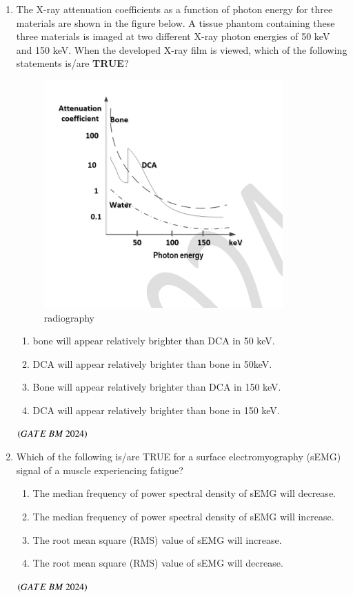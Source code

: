 \documentclass[journal,12pt,onecolumn]{IEEEtran}
\theoremstyle{remark}
\begin{document}
\begin{enumerate}
\item The X-ray attenuation coefficients as a function of photon energy for three materials are shown in the figure below. A tissue phantom containing these three materials is imaged at two different X-ray photon energies of 50 keV and 150 keV. When the developed X-ray film is viewed, which of the following statements is/are \textbf{TRUE}?
\begin{figure}[H]
\centering
\includegraphics[width=0.4\columnwidth]{Figs/Fig 14.png}
\caption{radiography}
\label{fig:placeholder}
\end{figure}
\begin{enumerate}[label=(\Alph*)]
    \item bone will appear relatively brighter than DCA in 50 keV.
    \item DCA will appear relatively brighter than bone in 50keV.
    \item Bone will appear relatively brighter than DCA in 150 keV.
    \item DCA will appear relatively brighter than bone in 150 keV.
\end{enumerate}
\hfill $\brak{GATE\ BM\ 2024}$

\item Which of the following is/are TRUE for a surface electromyography (sEMG) signal
of a muscle experiencing fatigue?
\begin{enumerate}[label=(\Alph*)]
\item  The median frequency of power spectral density of sEMG will decrease.
\item  The median frequency of power spectral density of sEMG will increase.
\item The root mean square (RMS) value of sEMG will increase.
\item The root mean square (RMS) value of sEMG will decrease.
\end{enumerate}
\hfill $\brak{GATE\ BM\ 2024}$


\end{enumerate}
\end{document}
